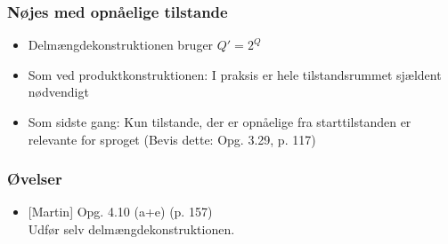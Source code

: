 \begin{frame}
\frametitle{Nøjes med opnåelige tilstande}
\begin{itemize}[<+->]
\item Delmængdekonstruktionen bruger $Q' = 2^Q$
\item Som ved produktkonstruktionen: I praksis er hele tilstandsrummet
  sjældent nødvendigt
\item Som sidste gang: Kun tilstande, der er opnåelige fra
  starttilstanden er relevante for sproget (Bevis dette: Opg. 3.29, p. 117)
\end{itemize}
\end{frame}
\begin{frame}
\frametitle{Øvelser}
\begin{itemize}
\item{} [Martin] Opg. 4.10 (a+e) (p. 157)\\
Udfør selv delmængdekonstruktionen.
\end{itemize}
\end{frame}

